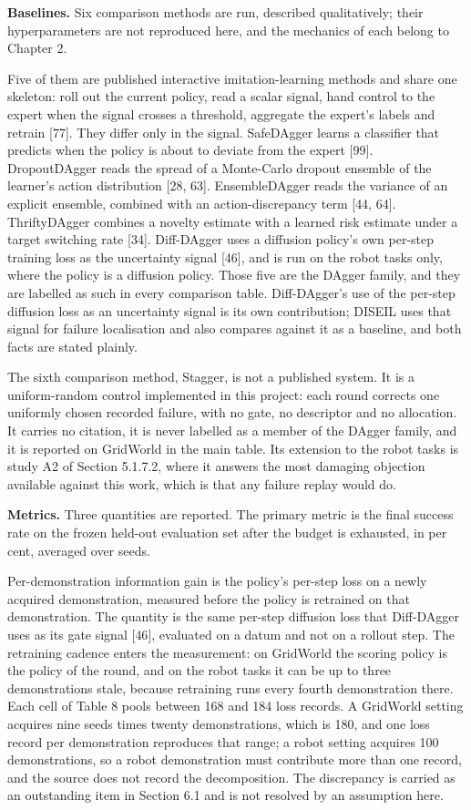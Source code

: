 \documentclass[
  11pt,
]{article}
\begin{document}
\textbf{Baselines.} Six comparison methods are run, described
qualitatively; their hyperparameters are not reproduced here, and the
mechanics of each belong to Chapter 2.

Five of them are published interactive imitation-learning methods and
share one skeleton: roll out the current policy, read a scalar signal,
hand control to the expert when the signal crosses a threshold,
aggregate the expert's labels and retrain {[}77{]}. They differ only in
the signal. SafeDAgger learns a classifier that predicts when the policy
is about to deviate from the expert {[}99{]}. DropoutDAgger reads the
spread of a Monte-Carlo dropout ensemble of the learner's action
distribution {[}28, 63{]}. EnsembleDAgger reads the variance of an
explicit ensemble, combined with an action-discrepancy term {[}44,
64{]}. ThriftyDAgger combines a novelty estimate with a learned risk
estimate under a target switching rate {[}34{]}. Diff-DAgger uses a
diffusion policy's own per-step training loss as the uncertainty signal
{[}46{]}, and is run on the robot tasks only, where the policy is a
diffusion policy. Those five are the DAgger family, and they are
labelled as such in every comparison table. Diff-DAgger's use of the
per-step diffusion loss as an uncertainty signal is its own
contribution; DISEIL uses that signal for failure localisation and also
compares against it as a baseline, and both facts are stated plainly.

The sixth comparison method, Stagger, is not a published system. It is a
uniform-random control implemented in this project: each round corrects
one uniformly chosen recorded failure, with no gate, no descriptor and
no allocation. It carries no citation, it is never labelled as a member
of the DAgger family, and it is reported on GridWorld in the main table.
Its extension to the robot tasks is study A2 of Section 5.1.7.2, where
it answers the most damaging objection available against this work,
which is that any failure replay would do.

\textbf{Metrics.} Three quantities are reported. The primary metric is
the final success rate on the frozen held-out evaluation set after the
budget is exhausted, in per cent, averaged over seeds.

Per-demonstration information gain is the policy's per-step loss on a
newly acquired demonstration, measured before the policy is retrained on
that demonstration. The quantity is the same per-step diffusion loss
that Diff-DAgger uses as its gate signal {[}46{]}, evaluated on a datum
and not on a rollout step. The retraining cadence enters the
measurement: on GridWorld the scoring policy is the policy of the round,
and on the robot tasks it can be up to three demonstrations stale,
because retraining runs every fourth demonstration there. Each cell of
Table 8 pools between 168 and 184 loss records. A GridWorld setting
acquires nine seeds times twenty demonstrations, which is 180, and one
loss record per demonstration reproduces that range; a robot setting
acquires 100 demonstrations, so a robot demonstration must contribute
more than one record, and the source does not record the decomposition.
The discrepancy is carried as an outstanding item in Section 6.1 and is
not resolved by an assumption here.
\end{document}
